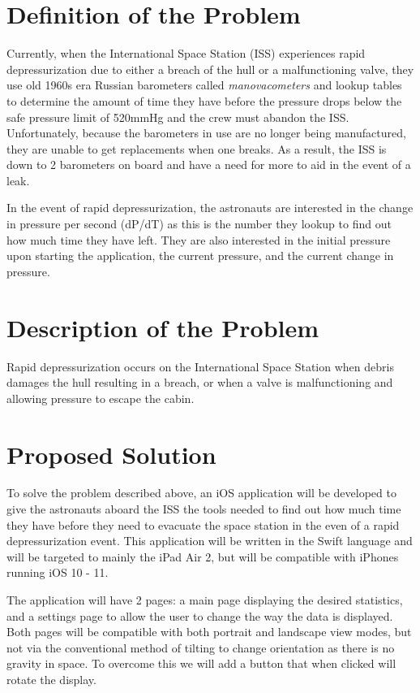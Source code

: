 \documentclass[onecolumn, draftclsnofoot,10pt, compsoc]{IEEEtran}
\begin{document}
\newpage
{}
\tableofcontents
\clearpage

\section{Definition of the Problem}
	Currently, when the International Space Station (ISS) experiences rapid depressurization due to either a breach of the hull or a malfunctioning valve, they use old 1960s era Russian barometers called \textit{manovacometers} and lookup tables to determine the amount of time they have before the pressure drops below the safe pressure limit of 520mmHg and the crew must abandon the ISS.
	Unfortunately, because the barometers in use are no longer being manufactured, they are unable to get replacements when one breaks.
	As a result, the ISS is down to 2 barometers on board and have a need for more to aid in the event of a leak.\par
	In the event of rapid depressurization, the astronauts are interested in the change in pressure per second (dP/dT) as this is the number they lookup to find out how much time they have left.
	They are also interested in the initial pressure upon starting the application, the current pressure, and the current change in pressure.

\section{Description of the Problem}
  Rapid depressurization occurs on the International Space Station when debris damages the hull resulting in a breach, or when a valve is malfunctioning and allowing pressure to escape the cabin.

\section{Proposed Solution}
  To solve the problem described above, an iOS application will be developed to give the astronauts aboard the ISS the tools needed to find out how much time they have before they need to evacuate the space station in the even of a rapid depressurization event.
  This application will be written in the Swift language and will be targeted to mainly the iPad Air 2, but will be compatible with iPhones running iOS 10 - 11.\par

  The application will have 2 pages: a main page displaying the desired statistics, and a settings page to allow the user to change the way the data is displayed.
  Both pages will be compatible with both portrait and landscape view modes, but not via the conventional method of tilting to change orientation as there is no gravity in space.
  To overcome this we will add a button that when clicked will rotate the display.
\end{document}
